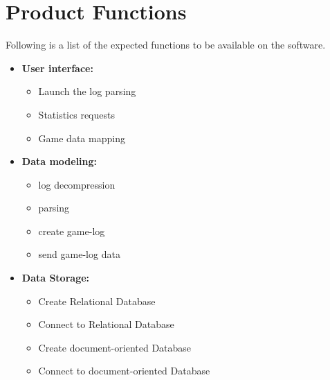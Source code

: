 \documentclass{scrreprt}
\begin{document}
\section{Product Functions}
Following is a list of the expected functions to be available on the software.
\begin{itemize}
\item{\textbf{User interface:}}
    \begin{itemize}
    \item{Launch the log parsing}
    \item{Statistics requests}
    \item{Game data mapping}
    \end{itemize}
  \item{\textbf{Data modeling:}}
    \begin{itemize}
    \item{log decompression}
    \item{parsing}
    \item{create game-log}
    \item{send game-log data}
    \end{itemize}
  \item{\textbf{Data Storage:}}
    \begin{itemize}
    \item{Create Relational Database}
    \item{Connect to Relational Database}
    \item{Create document-oriented Database}
    \item{Connect to document-oriented Database}

\end{itemize}
\end{itemize}
\end{document}
